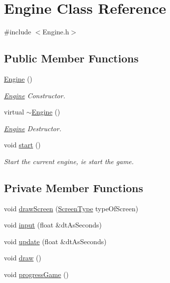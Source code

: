 \hypertarget{class_engine}{}\section{Engine Class Reference}
\label{class_engine}


{\ttfamily \#include $<$Engine.\+h$>$}

\subsection*{Public Member Functions}
\begin{DoxyCompactItemize}
\item 
\hyperlink{class_engine_a8c98683b0a3aa28d8ab72a8bcd0d52f2}{Engine} ()
\begin{DoxyCompactList}\small\item\em \hyperlink{class_engine}{Engine} Constructor. \end{DoxyCompactList}\item 
virtual \hyperlink{class_engine_a8ef7030a089ecb30bbfcb9e43094717a}{$\sim$\+Engine} ()
\begin{DoxyCompactList}\small\item\em \hyperlink{class_engine}{Engine} Destructor. \end{DoxyCompactList}\item 
void \hyperlink{class_engine_a4d8066dd213a03f5420d1bf60f150ca7}{start} ()
\begin{DoxyCompactList}\small\item\em Start the current engine, ie start the game. \end{DoxyCompactList}\end{DoxyCompactItemize}
\subsection*{Private Member Functions}
\begin{DoxyCompactItemize}
\item 
void \hyperlink{class_engine_a19be6708b8b65c5cfd8c13305f1e3c7f}{draw\+Screen} (\hyperlink{_engine_8h_a9f5ff9109158e83287c5c888bf7bb8a7}{Screen\+Type} type\+Of\+Screen)
\item 
void \hyperlink{class_engine_aa59920acbc4379a9672265904bc08b98}{input} (float \&dt\+As\+Seconds)
\item 
void \hyperlink{class_engine_af40c099ae4c70e308303ef5220ee9052}{update} (float \&dt\+As\+Seconds)
\item 
void \hyperlink{class_engine_a1b654dc41dfbcb5072147f33142b726e}{draw} ()
\item 
void \hyperlink{class_engine_a54ab8f7be8ce000f7bd83a98d41d6b98}{progress\+Game} ()
\end{DoxyCompactItemize}
